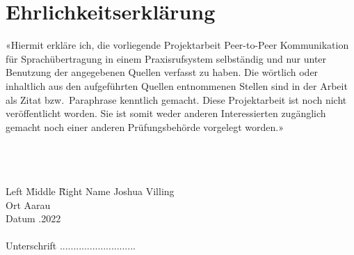 \section{Ehrlichkeitserklärung}

«Hiermit erkläre ich, die vorliegende Projektarbeit Peer-to-Peer Kommunikation für Sprachübertragung in einem Praxisrufsystem selbständig und nur unter Benutzung der angegebenen Quellen verfasst zu haben.
Die wörtlich oder inhaltlich aus den aufgeführten Quellen entnommenen Stellen sind in der Arbeit als Zitat bzw.\ Paraphrase kenntlich gemacht.
Diese Projektarbeit ist noch nicht veröffentlicht worden.
Sie ist somit weder anderen Interessierten zugänglich gemacht noch einer anderen Prüfungsbehörde vorgelegt worden.»

\begin{tabbing}
    \\
    \\
    \\
    Left \= Middle \=  \= Right \kill
    Name \> \> \>    Joshua Villing\\
    Ort \> \> \>    Aarau \\
    Datum \> \> .2022\\
    \\
    Unterschrift \> \> \>     ............................\\

\end{tabbing}
